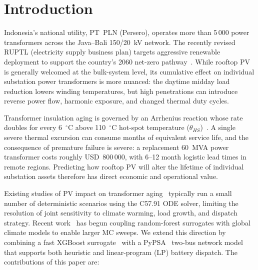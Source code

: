 \documentclass[conference]{IEEEtran}
\begin{document}
\section{Introduction}
\label{sec:intro}

Indonesia's national utility, PT~PLN (Persero), operates more than 5\,000 power transformers across the Java--Bali 150/20~kV network. The recently revised RUPTL (electricity supply business plan) targets aggressive renewable deployment to support the country's 2060 net-zero pathway~\cite{pln2025ruptl,iea2024indonesia,iesr2024outlook,adb2020indonesia}. While rooftop PV is generally welcomed at the bulk-system level, its cumulative effect on individual substation power transformers is more nuanced: the daytime midday load reduction lowers winding temperatures, but high penetrations can introduce reverse power flow, harmonic exposure, and changed thermal duty cycles.

Transformer insulation aging is governed by an Arrhenius reaction whose rate doubles for every 6~$^\circ$C above 110~$^\circ$C hot-spot temperature ($\theta_{HS}$)~\cite{ieee_c5791_2011}. A single severe thermal excursion can consume months of equivalent service life, and the consequence of premature failure is severe: a replacement 60~MVA power transformer costs roughly USD~800\,000, with 6--12 month logistic lead times in remote regions. Predicting how rooftop PV will alter the lifetime of individual substation assets therefore has direct economic and operational value.

Existing studies of PV impact on transformer aging~\cite{pezeshki2014pv,gaikwad2025evpv,majeed2022reverse} typically run a small number of deterministic scenarios using the C57.91 ODE solver, limiting the resolution of joint sensitivity to climate warming, load growth, and dispatch strategy. Recent work~\cite{chen2025climate} has begun coupling random-forest surrogates with global climate models to enable larger MC sweeps. We extend this direction by combining a fast XGBoost surrogate~\cite{chen2016xgboost} with a PyPSA~\cite{brown2018pypsa} two-bus network model that supports both heuristic and linear-program (LP) battery dispatch. The contributions of this paper are:
\end{document}
